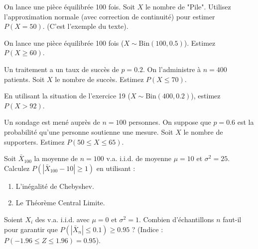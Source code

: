 
\begin{exercicebox}[Exercice 17 : Binomiale (Calcul P(X=k))]
On lance une pièce équilibrée 100 fois. Soit $X$ le nombre de "Pile".
Utilisez l'approximation normale (avec correction de continuité) pour estimer $P(X=50)$.
(C'est l'exemple du texte).
\end{exercicebox}

\begin{exercicebox}
On lance une pièce équilibrée 100 fois ($X \sim \text{Bin}(100, 0.5)$).
Estimez $P(X \ge 60)$.
\end{exercicebox}

\begin{exercicebox}
Un traitement a un taux de succès de $p=0.2$. On l'administre à $n=400$ patients. Soit $X$ le nombre de succès.
Estimez $P(X \le 70)$.
\end{exercicebox}

\begin{exercicebox}
En utilisant la situation de l'exercice 19 ($X \sim \text{Bin}(400, 0.2)$), estimez $P(X > 92)$.
\end{exercicebox}

\begin{exercicebox}
Un sondage est mené auprès de $n=100$ personnes. On suppose que $p=0.6$ est la probabilité qu'une personne soutienne une mesure. Soit $X$ le nombre de supporters.
Estimez $P(50 \le X \le 65)$.
\end{exercicebox}


\begin{exercicebox}
Soit $\bar{X}_{100}$ la moyenne de $n=100$ v.a. i.i.d. de moyenne $\mu=10$ et $\sigma^2=25$.
Calculez $P(|\bar{X}_{100} - 10| \ge 1)$ en utilisant :
\begin{enumerate}
    \item L'inégalité de Chebyshev.
    \item Le Théorème Central Limite.
\end{enumerate}
\end{exercicebox}

\begin{exercicebox}
Soient $X_i$ des v.a. i.i.d. avec $\mu=0$ et $\sigma^2=1$.
Combien d'échantillons $n$ faut-il pour garantir que $P(|\bar{X}_n| \le 0.1) \ge 0.95$ ?
(Indice : $P(-1.96 \le Z \le 1.96) = 0.95$).
\end{exercicebox}

